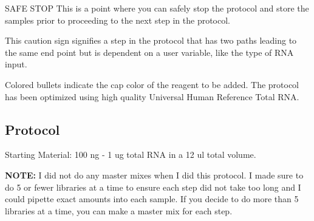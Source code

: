\documentclass[11pt, oneside]{article}
\begin{document}
		\begin{adjustwidth}{0.5in}{0pt}  SAFE STOP This is a point where you can safely stop the protocol and 		store the samples prior to proceeding to the next step in the protocol. 
		
		\vspace{2mm}
		
		\noindent {} This caution sign signifies a step in the protocol that has two paths leading to the same end 		point but is dependent on a user variable, like the type of RNA input. 
		
		\vspace{2mm}
		
		\noindent {} Colored bullets indicate the cap color of the reagent to be added. The protocol has been 			optimized using high quality Universal Human Reference Total RNA.
		\end{adjustwidth}
		
		\vspace{5mm}
		
	\subsection{Protocol}
		
		\vspace{4mm}
		
		Starting Material: 100 ng - 1 ug total RNA in a 12 ul total volume. 
		
		\vspace{4mm}
		
		
		\vspace{3mm}
		
		\begin{adjustwidth}{0.5in}{0pt} {\bf NOTE:} I did not do any master mixes when I did this protocol. I made sure to do 5 or fewer libraries at a time to 		ensure each step did not take too long and I could pipette exact amounts into each sample. If you decide to do more than 5 libraries at a time, you 		can make a master mix for each step. \end{adjustwidth}
		
		\newpage
		
\end{document}

